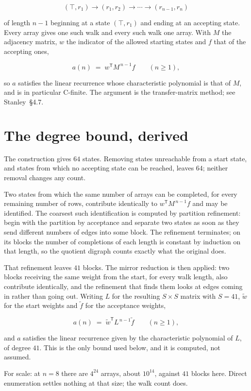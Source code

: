 \documentclass[11pt]{article}
\theoremstyle{definition}
\begin{document}
\[(\top,r_1) \to (r_1,r_2) \to \cdots \to (r_{n-1},r_n)\]

of length $n-1$ beginning at a state $(\top,r_1)$ and ending at an accepting state. Every array gives one such walk and every such walk one array. With $M$ the adjacency matrix, $w$ the indicator of the allowed starting states and $f$ that of the accepting ones,

\[a(n) \;=\; w^{\mathsf T} M^{\,n-1} f \qquad (n \ge 1),\]

so $a$ satisfies the linear recurrence whose characteristic polynomial is that of $M$, and is in particular C-finite. The argument is the transfer-matrix method; see Stanley~\S4.7.

\section{The degree bound, derived}

The construction gives $64$ states. Removing states unreachable from a start state, and states from which no accepting state can be reached, leaves $64$; neither removal changes any count.

Two states from which the same number of arrays can be completed, for every remaining number of rows, contribute identically to $w^{\mathsf T}M^{\,n-1}f$ and may be identified. The coarsest such identification is computed by partition refinement: begin with the partition by acceptance and separate two states as soon as they send different numbers of edges into some block. The refinement terminates; on its blocks the number of completions of each length is constant by induction on that length, so the quotient digraph counts exactly what the original does.

That refinement leaves $41$ blocks. The mirror reduction is then applied: two blocks receiving the same weight from the start, for every walk length, also contribute identically, and the refinement that finds them looks at edges coming in rather than going out. Writing $L$ for the resulting $S \times S$ matrix with $S = 41$, $\tilde w$ for the start weights and $\tilde f$ for the acceptance weights,

\[a(n) \;=\; \tilde w^{\mathsf T} L^{\,n-1} \tilde f \qquad (n \ge 1),\]

and $a$ satisfies the linear recurrence given by the characteristic polynomial of $L$, of degree $41$. This is the only bound used below, and it is computed, not assumed.

For scale: at $n = 8$ there are $4^{24}$ arrays, about $10^{14}$, against $41$ blocks here. Direct enumeration settles nothing at that size; the walk count does.
\end{document}
